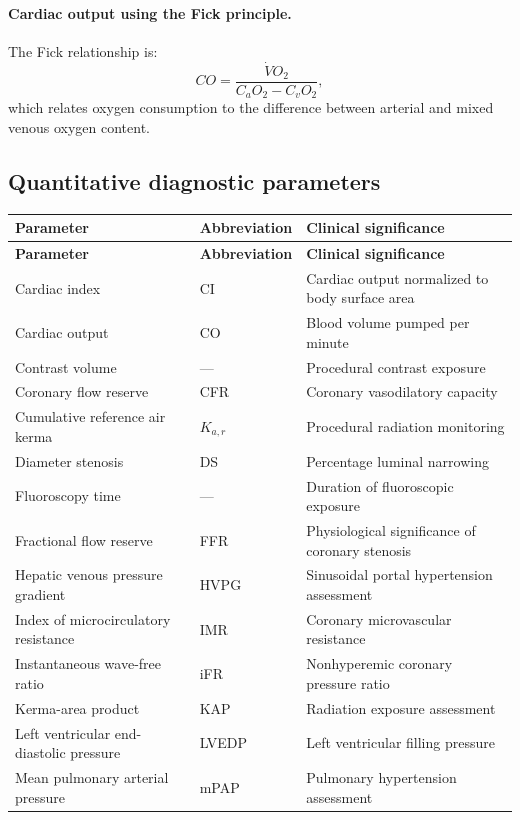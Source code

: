 \paragraph{Cardiac output using the Fick principle.} The Fick relationship is:
\begin{equation}
CO=\frac{\dot{V}O_2}{C_aO_2-C_vO_2},
\end{equation}
which relates oxygen consumption to the difference between arterial and mixed venous oxygen content.

\subsection{Quantitative diagnostic parameters}
\begin{longtable}{@{}p{}p{}p{}@{}}
\toprule
\textbf{Parameter} & \textbf{Abbreviation} & \textbf{Clinical significance} \\
\midrule
\endfirsthead
\toprule
\textbf{Parameter} & \textbf{Abbreviation} & \textbf{Clinical significance} \\
\midrule
\endhead
Cardiac index & CI & Cardiac output normalized to body surface area \\
Cardiac output & CO & Blood volume pumped per minute \\
Contrast volume & --- & Procedural contrast exposure \\
Coronary flow reserve & CFR & Coronary vasodilatory capacity \\
Cumulative reference air kerma & $K_{a,r}$ & Procedural radiation monitoring \\
Diameter stenosis & DS & Percentage luminal narrowing \\
Fluoroscopy time & --- & Duration of fluoroscopic exposure \\
Fractional flow reserve & FFR & Physiological significance of coronary stenosis \\
Hepatic venous pressure gradient & HVPG & Sinusoidal portal hypertension assessment \\
Index of microcirculatory resistance & IMR & Coronary microvascular resistance \\
Instantaneous wave-free ratio & iFR & Nonhyperemic coronary pressure ratio \\
Kerma-area product & KAP & Radiation exposure assessment \\
Left ventricular end-diastolic pressure & LVEDP & Left ventricular filling pressure \\
Mean pulmonary arterial pressure & mPAP & Pulmonary hypertension assessment \\

\end{longtable}
